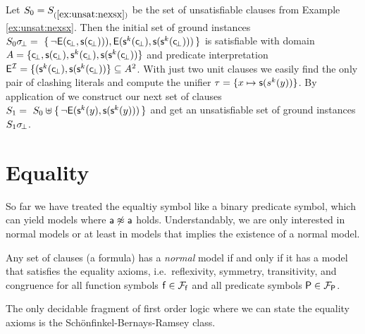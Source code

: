 \begin{example}\label{ex:unsat2}
Let $S_0 = S_{(\ref{ex:unsat:nexsx})}$ be the set of unsatisfiable clauses from Example \ref{ex:unsat:nexsx}. 
Then the initial set of ground instances 
$S_0\sigma\!_\bot =\
\{\,
{ \lnot{\mathsf{E}}({\mathsf c}\!_\bot, {\mathsf s}({\mathsf c}\!_\bot)))}, 
{ {\mathsf{E}}({\mathsf s}^k({\mathsf c}\!_\bot), {\mathsf s}({\mathsf s}^k({\mathsf c}\!_\bot)))}
\,\}$
is satisfiable with domain $A = \{ {\mathsf c}\!_\bot, {\mathsf s}({\mathsf c}\!_\bot), {\mathsf s}^k({\mathsf c}\!_\bot), {\mathsf s}({\mathsf s}^k({\mathsf c}\!_\bot)) \}$
and predicate interpretation 
${\mathsf{E}}^{\mathcal I} = \{ ({\mathsf s}^k({\mathsf c}\!_\bot), {\mathsf s}({\mathsf s}^k({\mathsf c}\!_\bot))
 \} \subseteq A^2$. 
% 
 With just two unit clauses we easily find the only pair of clashing literals and compute the unifier
 $\tau = \{ x\mapsto {\mathsf s}(s^k(y)) \}$. 
 By application of \InstGen we construct our next set of clauses
$
S_1 =\
S_0 \uplus
 \{\,
 { \lnot{\mathsf{E}}({\mathsf s}^k(y), {\mathsf s}({\mathsf s}^k(y)))}
 \,\}
 $ 
 and get an unsatisfiable set of ground instances $S_1\sigma\!_\bot$.
\end{example}




\section{Equality}

So far we have treated the equaltiy symbol like a binary predicate symbol, 
which can yield models where ${\mathsf a}\not\approx{\mathsf a}$ holds. 
Understandably, we are only interested in normal models or 
at least in models that implies the existence of a normal model.

\begin{theorem}\cite{Harrison:2009:HPL:1540610}
	Any set of clauses (a formula) has a \emph{normal} model 
	if and only if it has a model that satisfies the 
	{\myem equality axioms}, i.e.~reflexivity, symmetry, transitivity, 
	and congruence for all function symbols ${\mathsf f}\in{{\mathcal F}_{\mathsf f}}$
	and all predicate symbols ${\mathsf P}\in{{\mathcal F}_{\mathsf P}}$.
\end{theorem}

\begin{remark}
	The only decidable fragment of first order logic where we can state the equality axioms is the Schönfinkel-Bernays-Ramsey class.
\end{remark}

